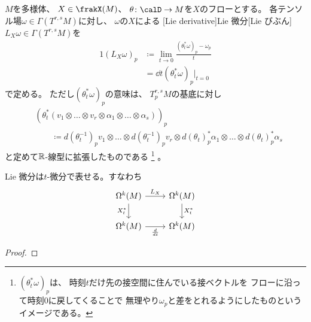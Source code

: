 \documentclass[report]{jlreq}
\begin{document}
\begin{definition}[Lie 微分]
    $M$を多様体、
    $X \in \frakX(M)$、
    $\theta \colon \calD \to M$を$X$のフローとする。
    各テンソル場$\omega \in \Gamma(T^{r, s} M)$に対し、
    $\omega$の$X$による
    [Lie derivative]{Lie 微分}[Lie びぶん]
    $L_X \omega \in \Gamma(T^{r, s} M)$を
    \begin{alignat}{1}
        (L_X \omega)_p
            &\coloneqq \lim_{t \to 0} \frac{(\theta_t^* \omega)_p - \omega_p}{t} \\
            &= \dd{t} (\theta_t^* \omega)_p \Big|_{t = 0}
    \end{alignat}
    で定める。
    ただし$(\theta_t^* \omega)_p$の意味は、
    $T_p^{r, s} M$の基底に対し
    \begin{align}
        &(\theta_t^* (
            v_1 \otimes \dots \otimes v_r \otimes \alpha_1 \otimes \dots \otimes \alpha_s
        ))_p \\
        &\qquad \coloneqq
            d(\theta^{-1}_t)_p v_1 \otimes \dots \otimes d(\theta^{-1}_t)_p v_r
            \otimes
            d(\theta_t)_p^* \alpha_1 \otimes \dots \otimes d(\theta_t)_p^* \alpha_s
    \end{align}
    と定めて$\mathbb{R}$-線型に拡張したものである
    \footnote{
        $(\theta_t^* \omega)_p$は、
        時刻$t$だけ先の接空間に住んでいる接ベクトルを
        フローに沿って時刻$0$に戻してくることで
        無理やり$\omega_p$と差をとれるようにしたものというイメージである。
    }
    。
\end{definition}

\begin{proposition}
    Lie 微分は$t$-微分で表せる。すなわち
    \begin{equation}
        \begin{tikzcd}
            \Omega^k(M)
                \ar{r}{L_X}
                \ar{d}[swap]{X_t^*}
                & \Omega^k(M)
                    \ar{d}{X_t^*}
                \\
            \Omega^k(M)
                \ar{r}[swap]{\dd{t}}
                & \Omega^k(M)
        \end{tikzcd}
    \end{equation}
\end{proposition}

\begin{proof}
    \TODO{}
\end{proof}
\end{document}
